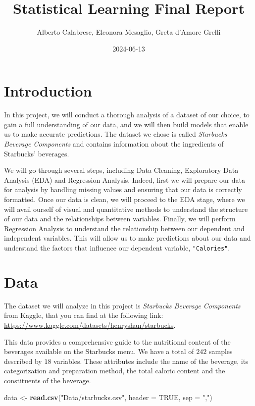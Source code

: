 \documentclass[
]{article}
\title{Statistical Learning Final Report}
\author{Alberto Calabrese, Eleonora Mesaglio, Greta d'Amore Grelli}
\date{2024-06-13}
\newenvironment{Shaded}{\begin{snugshade}}{\end{snugshade}}
\newcommand{\AttributeTok}[1]{\textcolor[rgb]{0.13,0.29,0.53}{#1}}
\newcommand{\ConstantTok}[1]{\textcolor[rgb]{0.56,0.35,0.01}{#1}}
\newcommand{\FunctionTok}[1]{\textcolor[rgb]{0.13,0.29,0.53}{\textbf{#1}}}
\newcommand{\NormalTok}[1]{#1}
\newcommand{\OtherTok}[1]{\textcolor[rgb]{0.56,0.35,0.01}{#1}}
\newcommand{\StringTok}[1]{\textcolor[rgb]{0.31,0.60,0.02}{#1}}
\begin{document}
\maketitle

{
\setcounter{tocdepth}{3}
\tableofcontents
}
\section{Introduction}\label{introduction}

In this project, we will conduct a thorough analysis of a dataset of our
choice, to gain a full understanding of our data, and we will then build
models that enable us to make accurate predictions. The dataset we chose
is called \emph{Starbucks Beverage Components} and contains information
about the ingredients of Starbucks' beverages.

We will go through several steps, including Data Cleaning, Exploratory
Data Analysis (EDA) and Regression Analysis. Indeed, first we will
prepare our data for analysis by handling missing values and ensuring
that our data is correctly formatted. Once our data is clean, we will
proceed to the EDA stage, where we will avail ourself of visual and
quantitative methods to understand the structure of our data and the
relationships between variables. Finally, we will perform Regression
Analysis to understand the relationship between our dependent and
independent variables. This will allow us to make predictions about our
data and understand the factors that influence our dependent variable,
\texttt{"Calories"}.

\section{Data}\label{data}

The dataset we will analyze in this project is \emph{Starbucks Beverage
Components} from Kaggle, that you can find at the following link:
\url{https://www.kaggle.com/datasets/henryshan/starbucks}.

This data provides a comprehensive guide to the nutritional content of
the beverages available on the Starbucks menu. We have a total of
\(242\) samples described by \(18\) variables. These attributes include
the name of the beverage, its categorization and preparation method, the
total caloric content and the constituents of the beverage.

\begin{Shaded}
\begin{Highlighting}[]
\NormalTok{data }\OtherTok{\textless{}{-}} \FunctionTok{read.csv}\NormalTok{(}\StringTok{"Data/starbucks.csv"}\NormalTok{, }\AttributeTok{header =} \ConstantTok{TRUE}\NormalTok{, }\AttributeTok{sep =} \StringTok{","}\NormalTok{)}
\end{Highlighting}
\end{Shaded}
\end{document}
